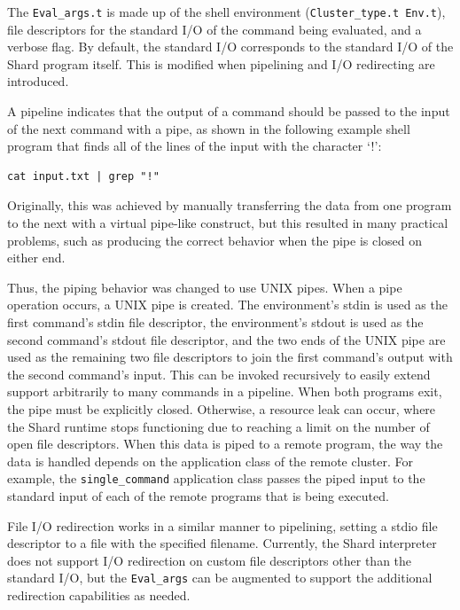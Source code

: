 \documentclass[twoside]{report}
\begin{document}
The \texttt{Eval\_args.t} is made up of the shell environment (\texttt{Cluster\_type.t Env.t}), file descriptors for the standard I/O of the command being evaluated, and a verbose flag.
By default, the standard I/O corresponds to the standard I/O of the Shard program itself.
This is modified when pipelining and I/O redirecting are introduced.

A pipeline indicates that the output of a command should be passed to the input of the next command with a pipe, as shown in the following example shell program that finds all of the lines of the input with the character `!':

\begin{minipage}[c]{\textwidth-15pt}
  \begin{lstlisting}[language=shard]
cat input.txt | grep "!"
\end{lstlisting}
  \smallskip
\end{minipage}

Originally, this was achieved by manually transferring the data from one program to the next with a virtual pipe-like construct, but this resulted in many practical problems, such as producing the correct behavior when the pipe is closed on either end.

Thus, the piping behavior was changed to use UNIX pipes.
When a pipe operation occurs, a UNIX pipe is created.
The environment's stdin is used as the first command's stdin file descriptor, the environment's stdout is used as the second command's stdout file descriptor, and the two ends of the UNIX pipe are used as the remaining two file descriptors to join the first command's output with the second command's input.
This can be invoked recursively to easily extend support arbitrarily to many commands in a pipeline.
When both programs exit, the pipe must be explicitly closed.
Otherwise, a resource leak can occur, where the Shard runtime stops functioning due to reaching a limit on the number of open file descriptors.
When this data is piped to a remote program, the way the data is handled depends on the application class of the remote cluster.
For example, the \texttt{single\_command} application class passes the piped input to the standard input of each of the remote programs that is being executed.

File I/O redirection works in a similar manner to pipelining, setting a stdio file descriptor to a file with the specified filename.
Currently, the Shard interpreter does not support I/O redirection on custom file descriptors other than the standard I/O, but the \texttt{Eval\_args} can be augmented to support the additional redirection capabilities as needed.
\end{document}
